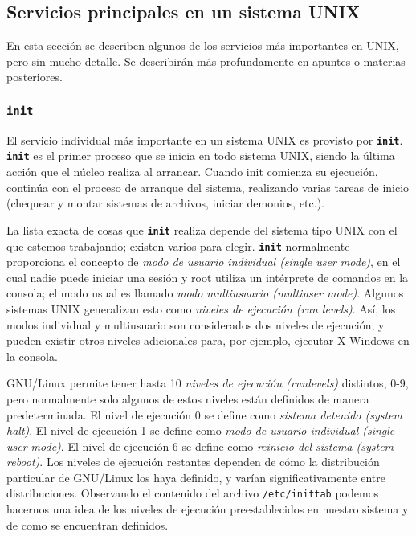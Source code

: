 \documentclass[12pt]{article}
\begin{document}
\subsection{Servicios principales en un sistema UNIX}

 En esta sección se describen algunos de los servicios más importantes en
UNIX, pero sin mucho detalle. Se describirán más profundamente en apuntes 
o materias posteriores. 

\subsubsection{\texttt{\textbf{init}}}

 El servicio individual más importante en un sistema UNIX es provisto por
\texttt{\textbf{init}}. \texttt{\textbf{init}} es el primer proceso que se
inicia en todo sistema UNIX, siendo la última acción que el núcleo realiza al
arrancar.  Cuando init comienza su ejecución, continúa con el proceso de
arranque del sistema, realizando varias tareas de inicio (chequear y montar
sistemas de archivos, iniciar demonios, etc.).  

 La lista exacta de cosas que \texttt{\textbf{init}} realiza depende del sistema tipo UNIX
con el que estemos trabajando; existen varios para elegir. \texttt{\textbf{init}} normalmente
proporciona el concepto de \textit{modo de usuario individual (single user mode)}, en el cual nadie puede
iniciar una sesión y root utiliza un intérprete de comandos en la consola; el
modo usual es llamado \textit{modo multiusuario (multiuser mode)}.
Algunos sistemas UNIX generalizan esto
como \textit{niveles de ejecución (run levels)}. Así, los modos individual y
multiusuario son considerados dos niveles de ejecución, y pueden existir otros
niveles adicionales para, por ejemplo, ejecutar X-Windows en la consola.


 GNU/Linux permite tener hasta 10 \textit{niveles de ejecución (runlevels)} distintos, 0-9,
pero normalmente solo algunos de estos niveles están definidos de manera predeterminada. El
nivel de ejecución 0 se define como \textit{sistema detenido (system halt)}. El nivel
de ejecución 1 se define como \textit{modo de usuario individual (single user mode)}.
El nivel de ejecución 6 se define como \textit{reinicio del sistema (system reboot)}.
Los niveles de ejecución restantes dependen de cómo la distribución particular
de GNU/Linux los haya definido, y varían significativamente entre
distribuciones. Observando el contenido del archivo
\texttt{/etc/inittab} podemos hacernos una idea de los niveles de
ejecución preestablecidos en nuestro sistema y de como se encuentran definidos.
\end{document}
